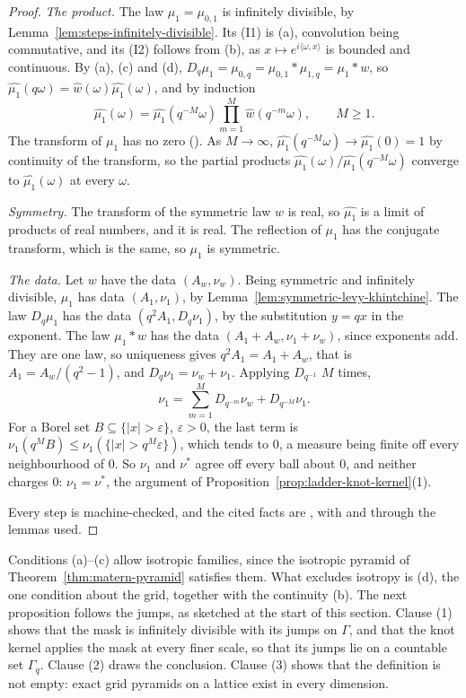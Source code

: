 \begin{proof}
\emph{The product.} The law $\mu_1 = \mu_{0,1}$ is infinitely divisible, by
Lemma~\ref{lem:steps-infinitely-divisible}. Its (I1) is (a), convolution being commutative, and its
(I2) follows from (b), as $x \mapsto e^{i\langle\omega, x\rangle}$ is bounded and continuous. By
(a), (c) and (d), $D_q\mu_1 = \mu_{0,q} = \mu_{0,1} * \mu_{1,q} = \mu_1 * w$, so
$\widehat{\mu_1}(q\omega) = \widehat{w}(\omega)\widehat{\mu_1}(\omega)$, and by induction
\[
\widehat{\mu_1}(\omega) = \widehat{\mu_1}(q^{-M}\omega)\prod_{m=1}^M\widehat{w}(q^{-m}\omega),
\qquad M \ge 1 .
\]
The transform of $\mu_1$ has no zero (). As $M \to \infty$,
$\widehat{\mu_1}(q^{-M}\omega) \to \widehat{\mu_1}(0) = 1$ by continuity of the transform, so the
partial products $\widehat{\mu_1}(\omega)/\widehat{\mu_1}(q^{-M}\omega)$ converge to
$\widehat{\mu_1}(\omega)$ at every $\omega$.

\emph{Symmetry.} The transform of the symmetric law $w$ is real, so $\widehat{\mu_1}$ is a limit of
products of real numbers, and it is real. The reflection of $\mu_1$ has the conjugate transform,
which is the same, so $\mu_1$ is symmetric.

\emph{The data.} Let $w$ have the data $(A_w, \nu_w)$. Being symmetric and infinitely divisible,
$\mu_1$ has data $(A_1, \nu_1)$, by Lemma~\ref{lem:symmetric-levy-khintchine}. The law $D_q\mu_1$
has the data $(q^2A_1, D_q\nu_1)$, by the substitution $y = qx$ in the exponent. The law
$\mu_1 * w$ has the data $(A_1 + A_w, \nu_1 + \nu_w)$, since exponents add. They are one law, so
uniqueness gives $q^2A_1 = A_1 + A_w$, that is $A_1 = A_w/(q^2 - 1)$, and
$D_q\nu_1 = \nu_w + \nu_1$. Applying $D_{q^{-1}}$ $M$ times,
\[
\nu_1 = \sum_{m=1}^M D_{q^{-m}}\nu_w + D_{q^{-M}}\nu_1 .
\]
For a Borel set $B \subseteq \{|x| > \varepsilon\}$, $\varepsilon > 0$, the last term is
$\nu_1(q^MB) \le \nu_1(\{|x| > q^M\varepsilon\})$, which tends to $0$, a \Levy{} measure being
finite off every neighbourhood of $0$. So $\nu_1$ and $\nu^*$ agree off every ball about $0$, and
neither charges $0$: $\nu_1 = \nu^*$, the argument of Proposition~\ref{prop:ladder-knot-kernel}(1).

Every step is machine-checked, and the cited facts are , with  and
 through the lemmas used.
\end{proof}

Conditions (a)--(c) allow isotropic families, since the isotropic \Matern{} pyramid of
Theorem~\ref{thm:matern-pyramid} satisfies them. What excludes isotropy is (d), the one condition
about the grid, together with the continuity (b). The next proposition follows the jumps, as
sketched at the start of this section. Clause (1) shows that the mask is infinitely divisible with
its jumps on $\Gamma$, and that the knot kernel applies the mask at every finer scale, so that its
jumps lie on a countable set $\Gamma_q$. Clause (2) draws the conclusion. Clause (3) shows that the
definition is not empty: exact grid pyramids on a lattice exist in every dimension.

